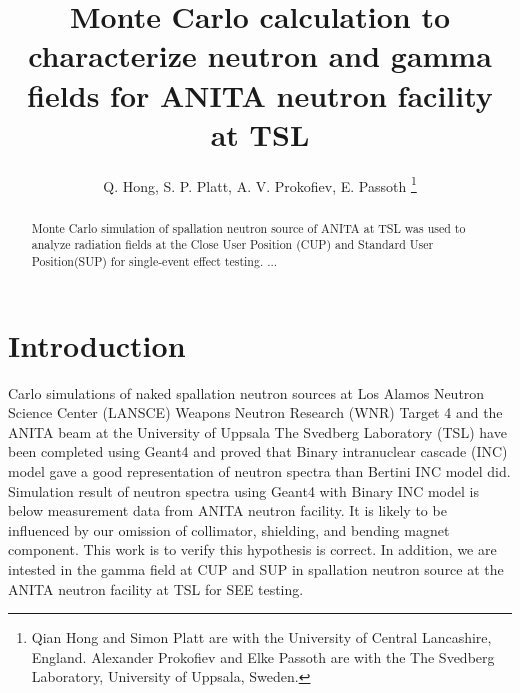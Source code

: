 \documentclass[11pt,a4paper]{IEEEtran}
\begin{document}
\title{
    Monte Carlo calculation to characterize neutron and gamma fields for ANITA neutron facility at TSL
}

\author{%
    Q. Hong,
    S. P. Platt,
    A. V. Prokofiev,
    E. Passoth
    \thanks{%
        Qian Hong and Simon Platt are with the University of Central Lancashire, England. Alexander Prokofiev and Elke Passoth are with the The Svedberg Laboratory, University of Uppsala, Sweden.
    }
}

\maketitle %

\begin{abstract}
    Monte Carlo simulation of spallation neutron source of ANITA at TSL was used to analyze radiation fields at the Close User Position (CUP) and Standard User Position(SUP) for single-event effect testing. ...
\end{abstract}

\section{Introduction}
 Carlo simulations of naked spallation neutron sources at Los Alamos Neutron Science Center (LANSCE) Weapons Neutron Research (WNR) Target 4\cite{Wender87} and the ANITA beam at the University of Uppsala The Svedberg Laboratory (TSL) have been completed using Geant4 and proved that Binary intranuclear cascade (INC) model gave a good representation of neutron spectra than Bertini INC model did\cite{Platt13}. Simulation result of neutron spectra using Geant4 with Binary INC model is below measurement data from ANITA neutron facility. It is likely to be influenced by our omission of collimator, shielding, and bending magnet component. This work is to verify this hypothesis is correct. In addition, we are intested in the gamma field at CUP and SUP in spallation neutron source at the ANITA neutron facility at TSL for SEE testing.
\end{document}
